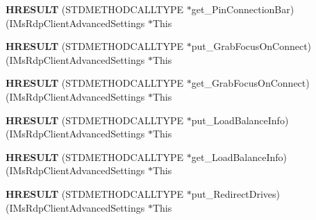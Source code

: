 \begin{DoxyCompactItemize}
\item 
\mbox{\label{struct_i_ms_rdp_client_advanced_settings_vtbl_abadf91a6b9b6559e3ed10480123237b1}} 
{\bfseries H\+R\+E\+S\+U\+LT} (S\+T\+D\+M\+E\+T\+H\+O\+D\+C\+A\+L\+L\+T\+Y\+PE $\ast$get\+\_\+\+Pin\+Connection\+Bar)(I\+Ms\+Rdp\+Client\+Advanced\+Settings $\ast$This
\item 
\mbox{\label{struct_i_ms_rdp_client_advanced_settings_vtbl_a3ce35435d6a4abbf458bc95faffbc5d4}} 
{\bfseries H\+R\+E\+S\+U\+LT} (S\+T\+D\+M\+E\+T\+H\+O\+D\+C\+A\+L\+L\+T\+Y\+PE $\ast$put\+\_\+\+Grab\+Focus\+On\+Connect)(I\+Ms\+Rdp\+Client\+Advanced\+Settings $\ast$This
\item 
\mbox{\label{struct_i_ms_rdp_client_advanced_settings_vtbl_a7229be0e6690a0a0e6ded25598eed185}} 
{\bfseries H\+R\+E\+S\+U\+LT} (S\+T\+D\+M\+E\+T\+H\+O\+D\+C\+A\+L\+L\+T\+Y\+PE $\ast$get\+\_\+\+Grab\+Focus\+On\+Connect)(I\+Ms\+Rdp\+Client\+Advanced\+Settings $\ast$This
\item 
\mbox{\label{struct_i_ms_rdp_client_advanced_settings_vtbl_acf996694be33f6cbbbaabbd35146369d}} 
{\bfseries H\+R\+E\+S\+U\+LT} (S\+T\+D\+M\+E\+T\+H\+O\+D\+C\+A\+L\+L\+T\+Y\+PE $\ast$put\+\_\+\+Load\+Balance\+Info)(I\+Ms\+Rdp\+Client\+Advanced\+Settings $\ast$This
\item 
\mbox{\label{struct_i_ms_rdp_client_advanced_settings_vtbl_af1d80dab996552ca75e0835ab9d260f3}} 
{\bfseries H\+R\+E\+S\+U\+LT} (S\+T\+D\+M\+E\+T\+H\+O\+D\+C\+A\+L\+L\+T\+Y\+PE $\ast$get\+\_\+\+Load\+Balance\+Info)(I\+Ms\+Rdp\+Client\+Advanced\+Settings $\ast$This
\item 
\mbox{\label{struct_i_ms_rdp_client_advanced_settings_vtbl_ad67ad9e14cb6bb5624ef28f688b224a2}} 
{\bfseries H\+R\+E\+S\+U\+LT} (S\+T\+D\+M\+E\+T\+H\+O\+D\+C\+A\+L\+L\+T\+Y\+PE $\ast$put\+\_\+\+Redirect\+Drives)(I\+Ms\+Rdp\+Client\+Advanced\+Settings $\ast$This
\item 
\mbox{\label{struct_i_ms_rdp_client_advanced_settings_vtbl_ab1fe17de848b30fbfd3a800abf4cec55}} 

\end{DoxyCompactItemize}
